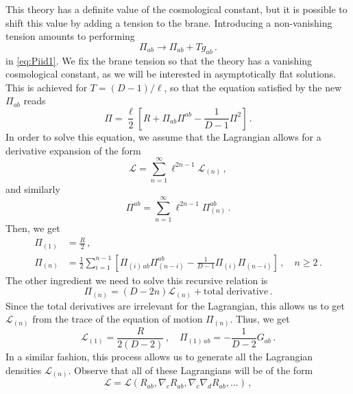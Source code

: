 \documentclass[11pt]{article}
\begin{document}
{This theory has a definite value of the cosmological constant, but it is possible to shift this value by adding a tension to the brane. Introducing a non-vanishing tension amounts to performing
\begin{equation}
\Pi_{ab}\rightarrow \Pi_{ab}+T g_{ab}\, .
\end{equation}
in \eqref{eq:Piid1}.
We fix the brane tension so that the theory has a vanishing cosmological constant, as we will be interested in asymptotically flat solutions. This is achieved for $T=(D-1)/\ell$, so that the equation satisfied by the new $\Pi_{ab}$ reads
\begin{equation}
\Pi=\frac{\ell}{2}\left[R+\Pi_{ab}\Pi^{ab}-\frac{1}{D-1}\Pi^2\right]\, .
\end{equation}
In order to solve this equation, we assume that the Lagrangian allows for a derivative expansion of the form
\begin{equation}
\mathcal{L}=\sum_{n=1}^{\infty} \ell^{2n-1}\mathcal{L}_{(n)}\, ,
\end{equation}
and similarly 
\begin{equation}
\Pi^{ab}=\sum_{n=1}^{\infty} \ell^{2n-1}\Pi^{ab}_{(n)}\, .
\end{equation}
Then, we get \cite{Bueno:2022log}
\begin{align}
\Pi_{(1)}&=\frac{R}{2}\, ,\\
\Pi_{(n)}&=\frac{1}{2}\sum_{i=1}^{n-1}\left[\Pi_{(i)\, ab}\Pi^{ab}_{(n-i)}-\frac{1}{D-1}\Pi_{(i)}\Pi_{(n-i)}\right]\, , \quad n\ge 2\, .
\label{Pinrecursive1}
\end{align}
The other ingredient we need to solve this recursive relation is \cite{Kraus:1999di}
\begin{equation}\label{PiL}
\Pi_{(n)}=(D-2n)\mathcal{L}_{(n)}+\text{total derivative}\, .
\end{equation}
Since the total derivatives are irrelevant for the Lagrangian, this allows us to get $\mathcal{L}_{(n)}$ from the trace of the equation of motion $\Pi_{(n)}$.
Thus, we get
\begin{equation}
\mathcal{L}_{(1)}=\frac{R}{2(D-2)}\, ,\quad \Pi_{(1)\, ab}=-\frac{1}{D-2}G_{ab}\, .
\end{equation}
In a similar fashion, this process allows us to generate all the Lagrangian densities $\mathcal{L}_{(n)}$. Observe that all of these Lagrangians will be of the form
\begin{equation}
\mathcal{L}=\mathcal{L}(R_{ab},\nabla_{c}R_{ab}, \nabla_{c}\nabla_{d}R_{ab}, \ldots)\, ,
\end{equation}
}
\end{document}
